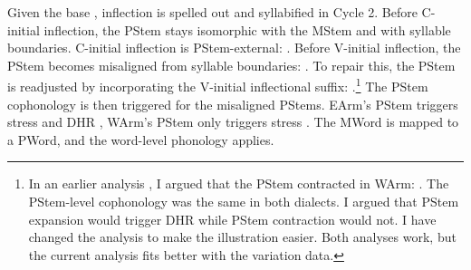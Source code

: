 Given the    base \textit{}, inflection is spelled out and syllabified in Cycle 2. Before C-initial inflection, the PStem stays isomorphic with the MStem and with syllable boundaries. C-initial inflection is PStem-external: \textit{}. Before V-initial inflection, the PStem becomes misaligned from syllable boundaries: \textit{}. To repair this,  the PStem is readjusted   by   incorporating the V-initial inflectional suffix:  \textit{}.\footnote{In an earlier analysis \citep{dolatian-2017-CLS2PublicationArm,dolatian-2019-PLCArmenianCycles}, I argued that the PStem contracted in WArm: \textit{}. The PStem-level cophonology was the same in both dialects. I argued that PStem expansion would trigger DHR while PStem contraction would not. I have changed the analysis to make the illustration easier. Both analyses work, but the current analysis fits better with the variation data.} The PStem cophonology is then triggered    for the misaligned PStems. EArm's PStem triggers stress and DHR \textit{}, WArm's PStem only triggers stress \textit{}. The MWord is mapped to a PWord, and the word-level phonology applies.%









